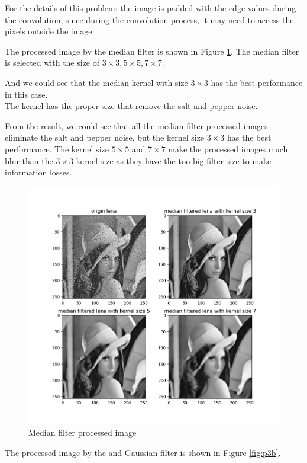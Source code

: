 \problem{}
For the details of this problem: the image is padded with the edge values during the convolution, since during the convolution process, it may need to access the pixels outside the image.

The processed image by the median filter is shown in Figure \ref{fig:p3a}.
The median filter is selected with the size of $3\times 3, 5\times 5, 7\times 7$.

And we could see that the median kernel with size $3 \times 3$ has the best performance in this case.\\
The kernel has the proper size that remove the salt and pepper noise.

From the result, we could see that all the median filter processed images eliminate the salt and pepper noise, but the kernel size $3 \times 3$ has the best performance. The kernel size $5 \times 5$ and $7 \times 7$ make the 
processed images much blur than the $3 \times 3$ kernel size as they have the too big filter size to make information losses.

\begin{figure}[htbp]
    \centering
	\includegraphics[width=\textwidth]{../images/p3/p3a.png}
    \caption{Median filter processed image}
\label{fig:p3a}
\end{figure}

The processed image by the and Gaussian filter is shown in Figure \ref{fig:p3b}.

